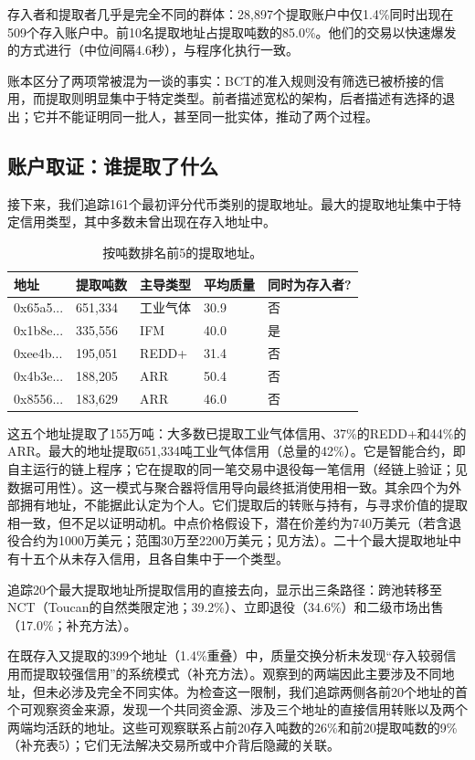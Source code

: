 \documentclass[12pt,a4paper]{article}
\begin{document}
存入者和提取者几乎是完全不同的群体：28,897个提取账户中仅1.4\%同时出现在509个存入账户中。前10名提取地址占提取吨数的85.0\%。他们的交易以快速爆发的方式进行（中位间隔4.6秒），与程序化执行一致。

账本区分了两项常被混为一谈的事实：BCT的准入规则没有筛选已被桥接的信用，而提取则明显集中于特定类型。前者描述宽松的架构，后者描述有选择的退出；它并不能证明同一批人，甚至同一批实体，推动了两个过程。


\subsection*{账户取证：谁提取了什么}

接下来，我们追踪161个最初评分代币类别的提取地址。最大的提取地址集中于特定信用类型，其中多数未曾出现在存入地址中。

\begin{table}[h!]
\caption{按吨数排名前5的提取地址。}\label{tab:top5}
\begin{tabular}{lllll}
\toprule
地址 & 提取吨数 & 主导类型 & 平均质量 & 同时为存入者? \\
\midrule
0x65a5... & 651,334 & 工业气体 & 30.9 & 否 \\
0x1b8e... & 335,556 & IFM & 40.0 & 是 \\
0xee4b... & 195,051 & REDD+ & 31.4 & 否 \\
0x4b3e... & 188,205 & ARR & 50.4 & 否 \\
0x8556... & 183,629 & ARR & 46.0 & 否 \\
\bottomrule
\end{tabular}
\end{table}

这五个地址提取了155万吨：大多数已提取工业气体信用、37\%的REDD+和44\%的ARR。最大的地址提取651,334吨工业气体信用（总量的42\%）。它是智能合约，即自主运行的链上程序；它在提取的同一笔交易中退役每一笔信用（经链上验证；见数据可用性）。这一模式与聚合器将信用导向最终抵消使用相一致。其余四个为外部拥有地址，不能据此认定为个人。它们提取后的转账与持有，与寻求价值的提取相一致，但不足以证明动机。中点价格假设下，潜在价差约为740万美元（若含退役合约为1000万美元；范围30万至2200万美元；见方法）。二十个最大提取地址中有十五个从未存入信用，且各自集中于一个类型。

追踪20个最大提取地址所提取信用的直接去向，显示出三条路径：跨池转移至NCT（Toucan的自然类限定池；39.2\%）、立即退役（34.6\%）和二级市场出售（17.0\%；补充方法）。

在既存入又提取的399个地址（1.4\%重叠）中，质量交换分析未发现“存入较弱信用而提取较强信用”的系统模式（补充方法）。观察到的两端因此主要涉及不同地址，但未必涉及完全不同实体。为检查这一限制，我们追踪两侧各前20个地址的首个可观察资金来源，发现一个共同资金源、涉及三个地址的直接信用转账以及两个两端均活跃的地址。这些可观察联系占前20存入吨数的26\%和前20提取吨数的9\%（补充表5）；它们无法解决交易所或中介背后隐藏的关联。
\end{document}

